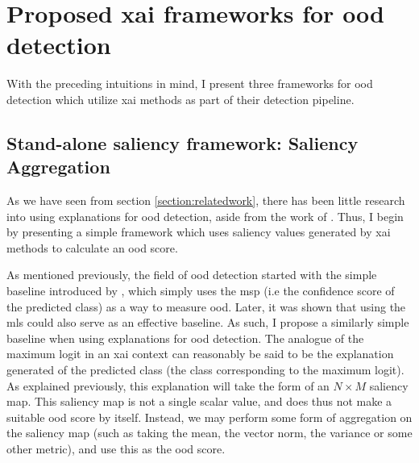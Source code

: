 \documentclass[UKenglish]{uiomasterthesis} %
\theoremstyle{definition}
\begin{document}
\section{Proposed \ac{xai} frameworks for \ac{ood} detection} \label{section:methods}

With the preceding intuitions in mind, I present three frameworks for \ac{ood} detection which utilize \ac{xai} methods as part of their detection pipeline.

\subsection{Stand-alone saliency framework: Saliency Aggregation} \label{section:saliencyagg_method}

As we have seen from section \ref{section:relatedwork}, there has been little research into using explanations for \ac{ood} detection, aside from the work of \cite{martinez}. Thus, I begin by presenting a simple framework which uses saliency values generated by \ac{xai} methods to calculate an \ac{ood} score.

As mentioned previously, the field of \ac{ood} detection started with the simple baseline introduced by \cite{oodbaseline}, which simply uses the \ac{msp} (i.e the confidence score of the predicted class) as a way to measure \ac{ood}. Later, it was shown that using the \ac{mls} could also serve as an effective baseline. As such, I propose a similarly simple baseline when using explanations for \ac{ood} detection. The analogue of the maximum logit in an \ac{xai} context can reasonably be said to be the explanation generated of the predicted class (the class corresponding to the maximum logit). As explained previously, this explanation will take the form of an $N \times M$ saliency map. This saliency map is not a single scalar value, and does thus not make a suitable \ac{ood} score by itself. Instead, we may perform some form of aggregation on the saliency map (such as taking the mean, the vector norm, the variance or some other metric), and use this as the \ac{ood} score.
\end{document}
